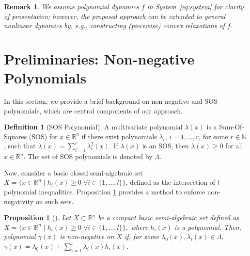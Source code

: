 \documentclass[journal,twoside,web]{ieeecolor}
\newcommand{\set}[1]{\{#1\}}
\newcommand{\algebraic}{X = \big \{ x \in \reals^n \mid h_i(x) \geq 0 \; \forall i \in \set{1, \ldots, l} \big \}}
\newcommand{\reals}{\mathbb{R}}
\newcommand{\naturals}{\mathbb{N}}
\theoremstyle{definition}
\newtheorem{definition}{Definition}
\theoremstyle{plain}
\newtheorem{proposition}[theorem]{Proposition}
\theoremstyle{plain}
\newtheorem{remark}{Remark}
\begin{document}
\begin{remark}
    We assume polynomial dynamics $f$ in System~\eqref{eq:system} for clarity of presentation; however, the proposed approach can be extended to general nonlinear dynamics by, e.g.,  constructing (piecewise) convex relaxations of $f$.
\end{remark}
\section{Preliminaries: Non-negative Polynomials}
\label{sec:SOS}

In this section, we provide a brief background on non-negative and SOS polynomials, which are central components of our approach.




\begin{definition}[SOS Polynomial]
\label{def:sosp1}
A multivariate polynomial $\lambda(x)$ is a Sum-Of-Squares (SOS) for $x \in \mathbb{R}^{n}$ if there exist polynomials $\lambda_{i}$, $i = 1, \ldots, r$, for some ${r \in \naturals}$, such that
$\lambda(x) = \sum_{i=1}^{r} \lambda_{i}^{2}(x).$
If $\lambda(x)$ is an SOS, then $\lambda(x) \geq 0$ for all $x \in \mathbb{R}^{n}$. The set of SOS polynomials is denoted by $\Lambda$.
\end{definition}

Now, consider a basic closed semi-algebraic set $\algebraic$, defined as the intersection of $l$ polynomial inequalities. Proposition \ref{prop:sosp1} provides a method to enforce non-negativity on such sets.
\begin{proposition}[\cite{Stengle1974}]
\label{prop:sosp1}
Let $X \subset \reals^n$ be a compact basic semi-algebraic set defined as
$\algebraic,$
where $h_i(x)$ is a polynomial. Then, polynomial $\gamma(x)$ is non-negative on $X$ if, for some $\lambda_{0}(x), \lambda_{i}(x) \in \Lambda$,
$\gamma (x) = \lambda_0(x) + \sum_{i=1}^{l} \lambda_{i}(x) h_{i}(x).$
\end{proposition}
\end{document}
